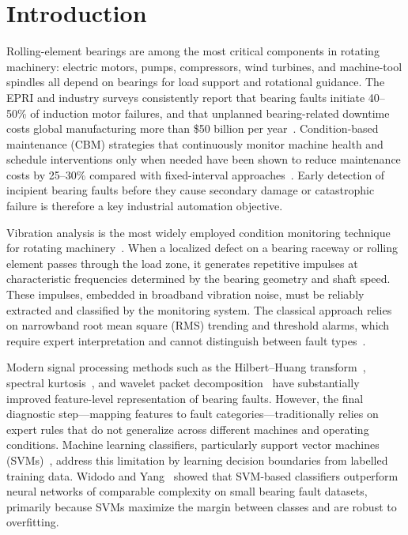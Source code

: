 \documentclass[conference,a4paper]{IEEEtran}[2015/08/26]
\begin{document}
\IEEEpeerreviewmaketitle

\section{Introduction}
\label{sec:intro}

Rolling-element bearings are among the most critical components in
rotating machinery: electric motors, pumps, compressors, wind turbines,
and machine-tool spindles all depend on bearings for load support and
rotational guidance. The EPRI and industry surveys consistently report
that bearing faults initiate 40--50\% of induction motor failures, and
that unplanned bearing-related downtime costs global manufacturing more
than \$50 billion per year~\cite{Nandi2005,Randall2011}. Condition-based
maintenance (CBM) strategies that continuously monitor machine health and
schedule interventions only when needed have been shown to reduce
maintenance costs by 25--30\% compared with fixed-interval
approaches~\cite{Jardine2006,ISO13373}. Early detection of incipient
bearing faults before they cause secondary damage or catastrophic failure
is therefore a key industrial automation objective.

Vibration analysis is the most widely employed condition monitoring
technique for rotating machinery~\cite{Scheffer2004}. When a localized
defect on a bearing raceway or rolling element passes through the load
zone, it generates repetitive impulses at characteristic frequencies
determined by the bearing geometry and shaft speed. These impulses,
embedded in broadband vibration noise, must be reliably extracted and
classified by the monitoring system. The classical approach relies on
narrowband root mean square (RMS) trending and threshold alarms, which
require expert interpretation and cannot distinguish between fault
types~\cite{McFadden1984}.

Modern signal processing methods such as the Hilbert--Huang
transform~\cite{Huang1998}, spectral kurtosis~\cite{Antoni2006}, and
wavelet packet decomposition~\cite{Peng2005} have substantially improved
feature-level representation of bearing faults. However, the final
diagnostic step---mapping features to fault categories---traditionally
relies on expert rules that do not generalize across different machines
and operating conditions. Machine learning classifiers, particularly
support vector machines (SVMs)~\cite{Cortes1995,Vapnik1998}, address
this limitation by learning decision boundaries from labelled training
data. Widodo and Yang~\cite{Widodo2007} showed that SVM-based
classifiers outperform neural networks of comparable complexity on
small bearing fault datasets, primarily because SVMs maximize the
margin between classes and are robust to overfitting.
\end{document}
